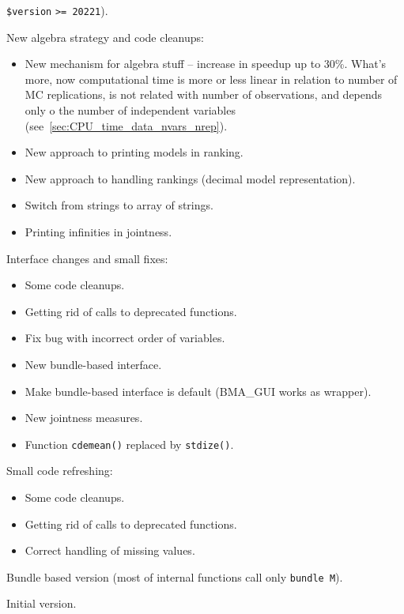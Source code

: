 \documentclass[article]{repec}
\begin{document}
{\begin{description}
\begin{itemize}
				\lstinline!$version! \footnotesize{\texttt{>= 20221}}).
		\end{itemize}
	\item[2.3] New algebra strategy and code cleanups:
		\begin{itemize}
			\item New mechanism for algebra stuff -- increase in
				speedup up to 30\%. What's more, now computational
				time is more or less linear in relation to number of
				MC replications, is not related with number
				of observations, and depends only o the number
				of independent variables (see~\ref{sec:CPU_time_data_nvars_nrep}).
			\item New approach to printing models in ranking.
			\item New approach to handling rankings (decimal
				model representation).
			\item Switch from strings to array of strings.
			\item Printing infinities in jointness.
		\end{itemize}
    \item[2.2] Interface changes and small fixes:
        \begin{itemize}
        	\item Some code cleanups.
        	\item Getting rid of calls to deprecated functions.
        	\item Fix bug with incorrect order of variables.
        	\item New bundle-based interface.
        	\item Make bundle-based interface is default (BMA\_GUI works as wrapper).
        	\item New jointness measures.
        	\item Function \texttt{cdemean()} replaced by \texttt{stdize()}.
        \end{itemize}
	\item[2.1] Small code refreshing:
		\begin{itemize}
			\item Some code cleanups.
			\item Getting rid of calls to deprecated functions.
			\item Correct handling of missing values.
		\end{itemize}
	\item[2.0] Bundle based version (most of internal
		functions call only \texttt{bundle M}).
	\item[1.0] Initial version.
\end{description}}
\end{document}
